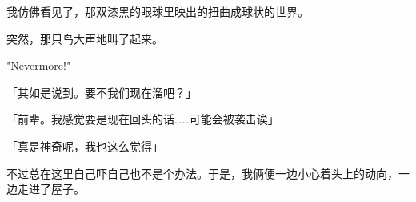 我仿佛看见了，那双漆黑的眼球里映出的扭曲成球状的世界。

突然，那只鸟大声地叫了起来。

"Nevermore!"

「其如是说到。要不我们现在溜吧？」

「前辈。我感觉要是现在回头的话……可能会被袭击诶」

「真是神奇呢，我也这么觉得」

不过总在这里自己吓自己也不是个办法。于是，我俩便一边小心着头上的动向，一边走进了屋子。
